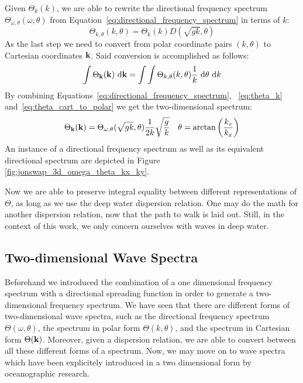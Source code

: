 Given $\Theta_k(k)$, we are able to rewrite the directional frequency spectrum
$\Theta_{\omega, \theta}(\omega, \theta)$ from
Equation~\ref{eq:directional_frequency_spectrum} in terms of \wavenumber $k$:
%
\begin{equation}
\label{eq:theta_k_polar}
 \Theta_{k,\theta}(k,\theta) = \Theta_k(k)D(\sqrt{gk},\theta)
\end{equation}
%
As the last step we need to convert from polar coordinate pairs 
$(k,\theta)$ to Cartesian \wavenumber coordinates $\mathbf{k}$. Said conversion 
is accomplished as follows:
%
\begin{equation}
\label{eq:theta_cart_to_polar}
\int\Theta_{\mathbf{k}}(\mathbf{k})~\mathrm{d}\mathbf{k} = 
\int\int\Theta_{k,\theta}(k,\theta)\frac{1}{k}~\mathrm{d}\theta~\mathrm{d}k
\end{equation}
%
By combining Equations~\ref{eq:directional_frequency_spectrum}, 
~\ref{eq:theta_k} and~\ref{eq:theta_cart_to_polar} we get the two-dimensional
\wavenumber spectrum:
%
\begin{align}
\Theta_{\mathbf{k}}(\mathbf{k}) = \Theta_{\omega,\theta}(\sqrt{gk}, 
\theta)\frac{1}{2k}\sqrt{\frac{g}{k}} &&
\theta = \arctan\left(\frac{k_z}{k_x}\right)
\end{align}
%
An instance of a directional frequency spectrum as well as its equivalent
directional \wavenumber spectrum are depicted in Figure
\ref{fig:jonswap_3d_omega_theta_kx_ky}.

Now we are able to preserve integral equality between different representations 
of $\Theta$, as long as we use the deep water dispersion relation. One may do 
the math for another dispersion relation, now that the path to walk is laid 
out. Still, in the context of this work, we only concern ourselves with waves 
in deep water.
%
\subsection{Two-dimensional Wave Spectra}
%
Beforehand we introduced the combination of a one dimensional 
frequency spectrum with a directional spreading function in order to generate a 
two-dimensional frequency spectrum. We have seen that there are different forms
of two-dimensional wave spectra, such as the directional frequency spectrum
$\Theta(\omega, \theta)$, the \wavenumber spectrum in polar form
$\Theta(k, \theta)$, and the \wavenumber spectrum in Cartesian form
$\Theta(\mathbf{k})$. Moreover, given a dispersion relation, we 
are able to convert between all these different forms of a spectrum. Now, we 
may move on to wave spectra which have been explicitely introduced in a two 
dimensional form by oceanographic research.

